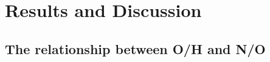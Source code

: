 \documentclass[usenatbib]{mnras} %
\begin{document}





\section{Results and Discussion}\label{Results}



\subsection{The relationship between O/H and N/O}
\end{document}
